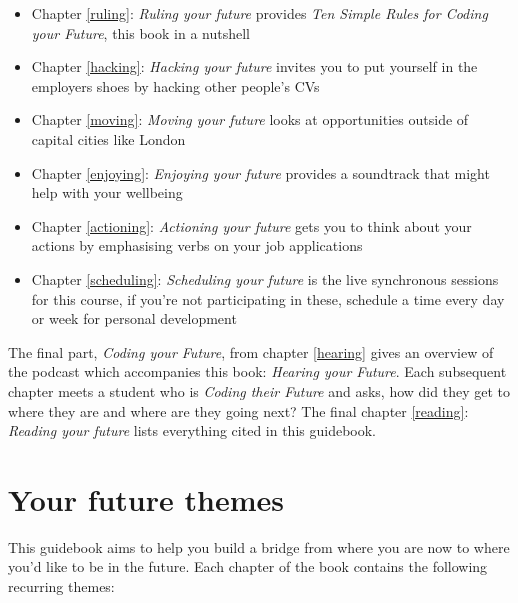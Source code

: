 \documentclass[
]{book}
\providecommand{\tightlist}{%
  \setlength{\itemsep}{0pt}\setlength{\parskip}{0pt}}
\begin{document}
\begin{itemize}
\tightlist
\item
  Chapter \ref{ruling}: \emph{Ruling your future} provides \emph{Ten Simple Rules for Coding your Future}, this book in a nutshell
\item
  Chapter \ref{hacking}: \emph{Hacking your future} invites you to put yourself in the employers shoes by hacking other people's CVs
\item
  Chapter \ref{moving}: \emph{Moving your future} looks at opportunities outside of capital cities like London
\item
  Chapter \ref{enjoying}: \emph{Enjoying your future} provides a soundtrack that might help with your wellbeing
\item
  Chapter \ref{actioning}: \emph{Actioning your future} gets you to think about your actions by emphasising verbs on your job applications
\item
  Chapter \ref{scheduling}: \emph{Scheduling your future} is the live synchronous sessions for this course, if you're not participating in these, schedule a time every day or week for personal development
\end{itemize}

The final part, \emph{Coding your Future}, from chapter \ref{hearing} gives an overview of the podcast which accompanies this book: \emph{Hearing your Future}. Each subsequent chapter meets a student who is \emph{Coding their Future} and asks, how did they get to where they are and where are they going next? The final chapter \ref{reading}: \emph{Reading your future} lists everything cited in this guidebook.

\hypertarget{themes}{%
\section{Your future themes}\label{themes}}

This guidebook aims to help you build a bridge from where you are now to where you'd like to be in the future. Each chapter of the book contains the following recurring themes:
\end{document}
